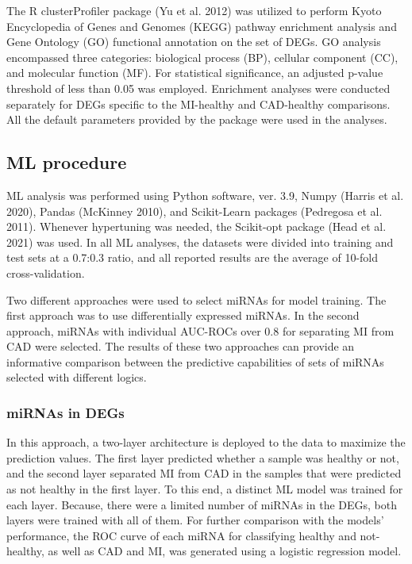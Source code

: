 \documentclass[smallextended]{svjour3}       %
\begin{document}
The R clusterProfiler package (Yu et al. 2012) was utilized to perform
Kyoto Encyclopedia of Genes and Genomes (KEGG) pathway enrichment
analysis and Gene Ontology (GO) functional annotation on the set of
DEGs. GO analysis encompassed three categories: biological process (BP),
cellular component (CC), and molecular function (MF). For statistical
significance, an adjusted p-value threshold of less than 0.05 was
employed. Enrichment analyses were conducted separately for DEGs
specific to the MI-healthy and CAD-healthy comparisons. All the default
parameters provided by the package were used in the analyses.

\hypertarget{ml-procedure}{%
\subsection{ML procedure}\label{ml-procedure}}

ML analysis was performed using Python software, ver. 3.9, Numpy (Harris
et al. 2020), Pandas (McKinney 2010), and Scikit-Learn packages
(Pedregosa et al. 2011). Whenever hypertuning was needed, the Scikit-opt
package (Head et al. 2021) was used. In all ML analyses, the datasets
were divided into training and test sets at a 0.7:0.3 ratio, and all
reported results are the average of 10-fold cross-validation.

Two different approaches were used to select miRNAs for model training.
The first approach was to use differentially expressed miRNAs. In the
second approach, miRNAs with individual AUC-ROCs over 0.8 for separating
MI from CAD were selected. The results of these two approaches can
provide an informative comparison between the predictive capabilities of
sets of miRNAs selected with different logics.

\hypertarget{mirnas-in-degs}{%
\subsubsection{miRNAs in DEGs}\label{mirnas-in-degs}}

In this approach, a two-layer architecture is deployed to the data to
maximize the prediction values. The first layer predicted whether a
sample was healthy or not, and the second layer separated MI from CAD in
the samples that were predicted as not healthy in the first layer. To
this end, a distinct ML model was trained for each layer. Because, there
were a limited number of miRNAs in the DEGs, both layers were trained
with all of them. For further comparison with the models' performance,
the ROC curve of each miRNA for classifying healthy and not-healthy, as
well as CAD and MI, was generated using a logistic regression model.
\end{document}

